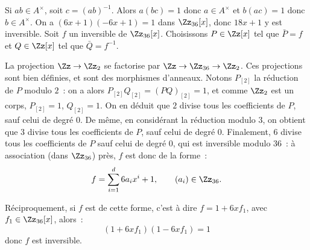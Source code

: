 {\begin{enumerate}
{Si $ab\in A^{\times}$, soit $c=(ab)^{-1}$. Alors $a(bc)=1$ donc $a\in
A^{\times}$ et $b(ac)=1$ donc $b\in A^{\times}$.
On a $(6x+1)(-6x+1)=1$ dans $\Zz_{36}[x]$, donc $18x+1$ y est inversible.
Soit $f$ un inversible de $\Zz_{36}[x]$. Choisissons $P\in\Zz[x]$ tel que
$\bar{P}=f$ et $Q\in\Zz[x]$ tel que $\bar{Q}=f^{-1}$.

La projection $\Zz\to\Zz_{2}$ se factorise par
$\Zz\to\Zz_{36}\to\Zz_{2}$. Ces projections sont bien définies, et sont
des morphismes d'anneaux. Notons $P_{[2]}$ la réduction de $P$ modulo
$2$~: on a alors $P_{[2]}Q_{[2]}=(PQ)_{[2]}=1$, et comme $\Zz_{2}$ est un
corps, $P_{[2]}=1$, $Q_{[2]}=1$. On en déduit que $2$ divise tous les
coefficients de $P$, sauf celui de degré $0$. De même, en considérant la
réduction modulo $3$, on obtient que $3$ divise tous les coefficients de
$P$, sauf celui de degré $0$. Finalement, $6$ divise tous les
coefficients de $P$ sauf celui de degré $0$, qui est inversible modulo
$36$~: à association (dans $\Zz_{36}$) près, $f$ est donc de la forme~:
$$
f=\sum_{i=1}^{d} 6a_{i} x^{i}+1,\qquad (a_{i})\in\Zz_{36}.
$$

Réciproquement, si $f$ est de cette forme, c'est à dire  $f=1+6xf_{1}$,
avec $f_{1}\in\Zz_{36}[x]$, alors~:
$$
 (1+6xf_{1})(1-6xf_{1})=1
$$
donc $f$ est inversible.
}
\end{enumerate}
}
